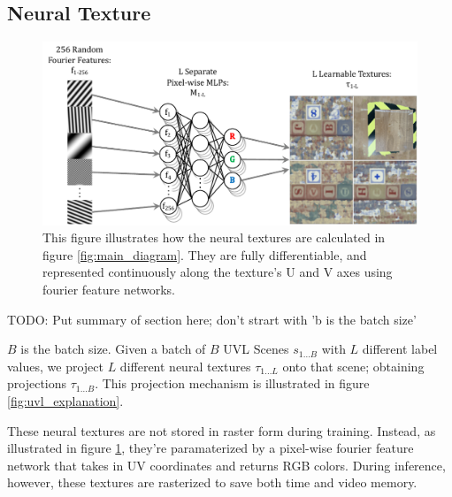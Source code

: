 \documentclass{article}
\begin{document}
\subsection{Neural Texture}

	\begin{figure}[H]
		\begin{center}
			\includegraphics[width=400pt]{../images/learnable_textures.pdf}
		\end{center}
		\caption{
			This figure illustrates how the neural textures are calculated in figure \ref{fig:main_diagram}. They are fully differentiable, and represented continuously along the texture's U and V axes using fourier feature networks.
		}
		\label{fig:learnable_textures}
	\end{figure}

	TODO: Put summary of section here; don't strart with 'b is the batch size' 

	$B$ is the batch size. Given a batch of $B$ UVL Scenes $s_{1\dots B}$ with $L$ different label values, we project $L$ different neural textures $\tau_{1\dots L}$ onto that scene; obtaining projections $\tau_{1\dots B}$. This projection mechanism is illustrated in figure \ref{fig:uvl_explanation}.

	These neural textures are not stored in raster form during training. Instead, as illustrated in figure \ref{fig:learnable_textures}, they're paramaterized by a pixel-wise fourier feature network \cite{fourier_feature_networks} that takes in UV coordinates and returns RGB colors. During inference, however, these textures are rasterized to save both time and video memory.
	
\end{document}

